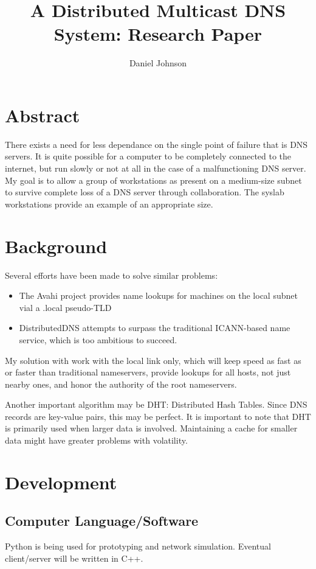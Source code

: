 \documentclass[12pt,letterpaper,titlepage]{article}
\begin{document}
\author{Daniel Johnson}
\title{A Distributed Multicast DNS System: Research Paper}
\maketitle
\section{Abstract}
There exists a need for less dependance on the single point of failure that is DNS servers. It is quite possible for a computer to be completely connected to the internet, but run slowly or not at all in the case of a malfunctioning DNS server. My goal is to allow a group of workstations as present on a medium-size subnet to survive complete loss of a DNS server through collaboration. The syslab workstations provide an example of an appropriate size.
\section{Background}
Several efforts have been made to solve similar problems:
\begin{itemize}
\item The Avahi project provides name lookups for machines on the local subnet vial a .local pseudo-TLD
\item DistributedDNS attempts to surpass the traditional ICANN-based name service, which is too ambitious to succeed.
\end{itemize}
My solution with work with the local link only, which will keep speed as fast as or faster than traditional nameservers, provide lookups for all hosts, not just nearby ones, and honor the authority of the root nameservers.

Another important algorithm may be DHT: Distributed Hash Tables. Since DNS records are key-value pairs, this may be perfect. It is important to note that DHT is primarily used when larger data is involved. Maintaining a cache for smaller data might have greater problems with volatility.
\section{Development}
\subsection{Computer Language/Software}
Python is being used for prototyping and network simulation. Eventual client/server will be written in C++.
\end{document}

